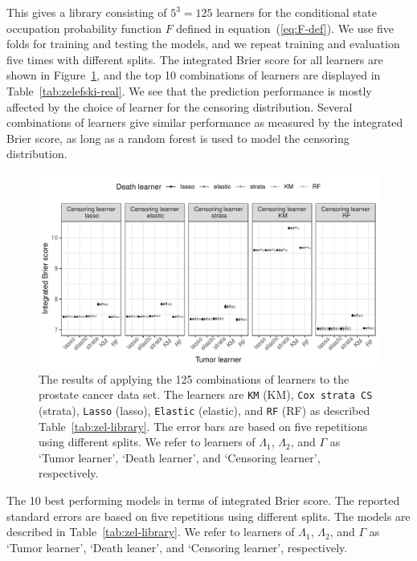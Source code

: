 \documentclass[a4,danish]{article}
\begin{document}
This gives a library consisting of \( 5^3 = 125 \) learners for the conditional
state occupation probability function \( F \) defined in
equation~(\ref{eq:F-def}). We use five folds for training and testing the
models, and we repeat training and evaluation five times with different splits.
The integrated Brier score for all learners are shown in
Figure~\ref{fig:zelefski-real}, and the top 10 combinations of learners are
displayed in Table~\ref{tab:zelefski-real}. We see that the prediction
performance is mostly affected by the choice of learner for the censoring
distribution. Several combinations of learners give similar performance as
measured by the integrated Brier score, as long as a random forest is used to
model the censoring distribution.

\begin{figure}
  \centerline{\includegraphics[width=1\linewidth]{./figures/zelefski-real-data.pdf}}
  \caption[]{The results of applying the 125 combinations of learners to the
    prostate cancer data set. The learners are \texttt{KM} (KM), \texttt{Cox
      strata CS} (strata), \texttt{Lasso} (lasso), \texttt{Elastic} (elastic),
    and \texttt{RF} (RF) as described Table~\ref{tab:zel-library}. The error
    bars are based on five repetitions using different splits. We refer to
    learners of \( \Lambda_1 \), \( \Lambda_2 \), and $\Gamma$ as `Tumor
    learner', `Death learner', and `Censoring learner', respectively.}
  \label{fig:zelefski-real}
\end{figure}

\begin{table}[ht]
  \centering 
  \caption{The 10 best performing models in terms of integrated Brier score. The
    reported standard errors are based on five repetitions using different
    splits. The models are described in Table~\ref{tab:zel-library}. We refer to
    learners of \( \Lambda_1 \), \( \Lambda_2 \), and $\Gamma$ as `Tumor
    learner', `Death leaner', and `Censoring learner', respectively.}
  \label{tab:zelefski-real}
\end{table}
\end{document}
